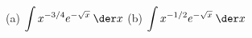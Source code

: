 (a)
 $\displaystyle \int x^{-3/4}e^{-\sqrt{x}}\:\der x$
 \qquad
 (b)
 $\displaystyle \int x^{-1/2}e^{-\sqrt{x}}\:\der x$
\answercheck
